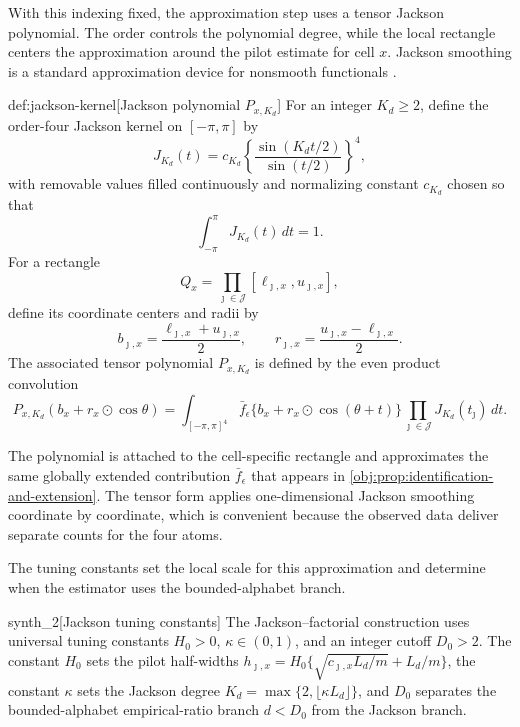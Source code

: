 With this indexing fixed, the approximation step uses a tensor Jackson polynomial. The order  controls the polynomial degree, while the local rectangle  centers the approximation around the pilot estimate for cell \(x\). Jackson smoothing is a standard approximation device for nonsmooth functionals \citep{DeVore1993,JiaoVenkatHanWeissman2015Functionals}.

\begin{definitionv}{def:jackson-kernel}[Jackson polynomial \(P_{x,K_d}\)]
For an integer \(K_d\ge 2\), define the order-four Jackson kernel on \([-\pi,\pi]\) by
\[
J_{K_d}(t)
=
c_{K_d}
\left\{
\frac{\sin(K_dt/2)}{\sin(t/2)}
\right\}^{4},
\]
with removable values filled continuously and normalizing constant \(c_{K_d}\) chosen so that
\[
\int_{-\pi}^{\pi} J_{K_d}(t)\,dt=1.
\]
For a rectangle
\[
Q_x
=
\prod_{\jmath\in\mathcal J}
[\ell_{\jmath,x},u_{\jmath,x}],
\]
define its coordinate centers and radii by
\[
b_{\jmath,x}
=
\frac{\ell_{\jmath,x}+u_{\jmath,x}}{2},
\qquad
r_{\jmath,x}
=
\frac{u_{\jmath,x}-\ell_{\jmath,x}}{2}.
\]
The associated tensor polynomial \(P_{x,K_d}\) is defined by the even product convolution
\[
P_{x,K_d}(b_x+r_x\odot\cos\theta)
=
\int_{[-\pi,\pi]^4}
\bar f_\epsilon\{b_x+r_x\odot\cos(\theta+t)\}
\prod_{\jmath\in\mathcal J}J_{K_d}(t_{\jmath})\,dt.
\]
\end{definitionv}

The polynomial  is attached to the cell-specific rectangle and approximates the same globally extended contribution \(\bar f_\epsilon\) that appears in \cref{obj:prop:identification-and-extension}. The tensor form applies one-dimensional Jackson smoothing coordinate by coordinate, which is convenient because the observed data deliver separate counts for the four atoms.

The tuning constants set the local scale for this approximation and determine when the estimator uses the bounded-alphabet branch.

\begin{definitionv}{synth_2}[Jackson tuning constants]
The Jackson--factorial construction uses universal tuning constants \(H_0>0\), \(\kappa\in(0,1)\), and an integer cutoff \(D_0>2\). The constant \(H_0\) sets the pilot half-widths \(h_{\jmath,x}=H_0\{\sqrt{c_{\jmath,x}L_d/m}+L_d/m\}\), the constant \(\kappa\) sets the Jackson degree \(K_d=\max\{2,\lfloor\kappa L_d\rfloor\}\), and \(D_0\) separates the bounded-alphabet empirical-ratio branch \(d<D_0\) from the Jackson branch.
\end{definitionv}

